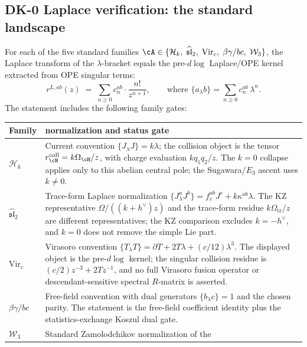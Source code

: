 \subsection{DK-0 Laplace verification: the standard landscape}
\label{sec:DK-0}

\begin{proposition}
\label{prop:dk0-laplace-five-families}
For each of the five standard families
$\cA \in \{\mathcal{H}_k,\;
\widehat{\mathfrak{sl}}_2,\;
\mathrm{Vir}_c,\;
\beta\gamma\text{/}bc,\;
\mathcal{W}_3\}$,
the Laplace transform of the $\lambda$-bracket equals the
pre-\textup{\(d\log\)} Laplace/OPE kernel extracted from OPE singular
terms:
\[
 r^{L,ab}(z)
 \;=\;
 \sum_{n \geq 0}
 c_n^{ab} \cdot \frac{n!}{z^{n+1}},
 \qquad
 \text{where }
 \{a_\lambda b\} = \sum_{n \geq 0} c_n^{ab}\, \lambda^n.
\]
The statement includes the following family gates:
\begin{center}
\begin{tabular}{p{}p{}}
\textbf{Family} & \textbf{normalization and status gate} \\
\hline
$\mathcal H_k$ & Current convention
$\{J_\lambda J\}=k\lambda$; the collision object is the tensor
$r^{\mathrm{coll}}_{\cH}=k\Omega_{\cH}/z$, with charge evaluation
$kq_1q_2/z$.  The $k=0$ collapse applies only to this abelian
central pole; the Sugawara/$E_3$ ascent uses $k\ne0$. \\
$\widehat{\mathfrak{sl}}_2$ & Trace-form Laplace normalization
$\{J^a_\lambda J^b\}=f^{ab}_{c}J^c+k\kappa^{ab}\lambda$.  The KZ
representative $\Omega/((k+h^\vee)z)$ and the trace-form residue
$k\Omega_{\mathrm{tr}}/z$ are different representatives; the KZ comparison excludes
$k=-h^\vee$, and $k=0$ does not remove the simple Lie part. \\
$\mathrm{Vir}_c$ & Virasoro convention
$\{T_\lambda T\}=\partial T+2T\lambda+(c/12)\lambda^3$.  The displayed
object is the pre-\textup{\(d\log\)} kernel; the singular collision
residue is $(c/2)z^{-3}+2Tz^{-1}$, and no full Virasoro fusion
operator or descendant-sensitive spectral \(R\)-matrix is asserted. \\
$\beta\gamma/bc$ & Free-field convention with dual generators
$\{b_\lambda c\}=1$ and the chosen parity.  The statement is the
free-field coefficient identity plus the statistics-exchange Koszul
dual gate. \\
$\mathcal W_3$ & Standard Zamolodchikov normalization of the

\end{tabular}
\end{center}
\end{proposition}
